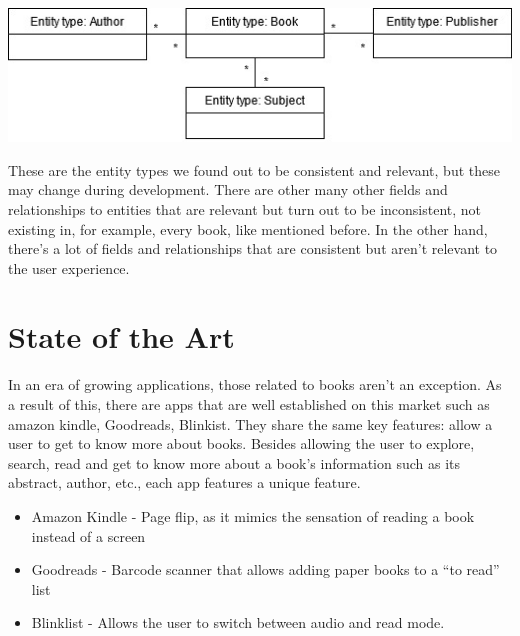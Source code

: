 \documentclass[twocolumn,twoside,11pt,a4paper]{article}
\begin{document}
\begin{dataFigure}\hspace{5mm}
    \centering\includegraphics[width=1.0\linewidth]{dataModel.jpg}
\end{dataFigure}\hspace{5mm}

These are the entity types we found out to be consistent and relevant, but these may change during development. There are other many other fields and relationships to entities that are relevant but turn out to be inconsistent, not existing in, for example, every book, like mentioned before. In the other hand, there's a lot of fields and relationships that are consistent but aren't relevant to the user experience.


\section{State of the Art}\label{sec:state of the art}

 In an era of growing applications, those related to books aren’t an exception. As a result of this, there are apps that are well established on this market such as amazon kindle, Goodreads, Blinkist. They share the same key features: allow a user to get to know more about books. Besides allowing the user to explore, search, read and get to know more about a book’s information such as its abstract, author, etc., each app features a unique feature.

\begin{itemize}
    \item Amazon Kindle - Page flip, as it mimics the sensation of reading a book instead of a screen
    \item Goodreads - Barcode scanner that allows adding paper books to a “to read” list
    \item Blinklist - Allows the user to switch between audio and read mode.
\end{itemize}

\end{document}
